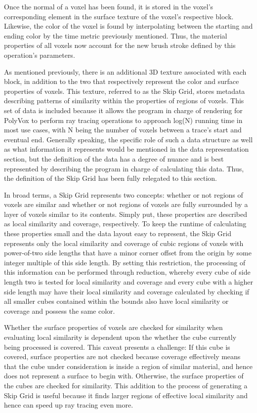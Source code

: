 \documentclass[onecolumn, draftclsnofoot,10pt, compsoc]{IEEEtran}
\newcounter{threesection}[subsubsection]
\newcounter{foursection}[threesection]
\begin{document}
Once the normal of a voxel has been found, it is stored in the voxel’s corresponding element in the surface texture of the voxel’s respective block.
Likewise, the color of the voxel is found by interpolating between the starting and ending color by the time metric previously mentioned.
Thus, the material properties of all voxels now account for the new brush stroke defined by this operation’s parameters.


As mentioned previously, there is an additional 3D texture associated with each block, in addition to the two that respectively represent the color and surface properties of voxels.
This texture, referred to as the Skip Grid, stores metadata describing patterns of similarity within the properties of regions of voxels.
This set of data is included because it allows the program in charge of rendering for PolyVox to perform ray tracing operations to approach log(N) running time in most use cases, with N being the number of voxels between a trace’s start and eventual end.
Generally speaking, the specific role of such a data structure as well as what information it represents would be mentioned in the data representation section, but the definition of the data has a degree of nuance and is best represented by describing the program in charge of calculating this data.
Thus, the definition of the Skip Grid has been fully relegated to this section.

In broad terms, a Skip Grid represents two concepts: whether or not regions of voxels are similar and whether or not regions of voxels are fully surrounded by a layer of voxels similar to its contents.
Simply put, these properties are described as local similarity and coverage, respectively.
To keep the runtime of calculating these properties small and the data layout easy to represent, the Skip Grid represents only the local similarity and coverage of cubic regions of voxels with power-of-two side lengths that have a minor corner offset from the origin by some integer multiple of this side length.
By setting this restriction, the processing of this information can be performed through reduction, whereby every cube of side length two is tested for local similarity and coverage and every cube with a higher side length may have their local similarity and coverage calculated by checking if all smaller cubes contained within the bounds also have local similarity or coverage and possess the same color.

Whether the surface properties of voxels are checked for similarity when evaluating local similarity is dependent upon the whether the cube currently being processed is covered.
This caveat presents a challenge:
If this cube is covered, surface properties are not checked because coverage effectively means that the cube under consideration is inside a region of similar material, and hence does not represent a surface to begin with.
Otherwise, the surface properties of the cubes are checked for similarity.
This addition to the process of generating a Skip Grid is useful because it finds larger regions of effective local similarity and hence can speed up ray tracing even more.
\end{document}
